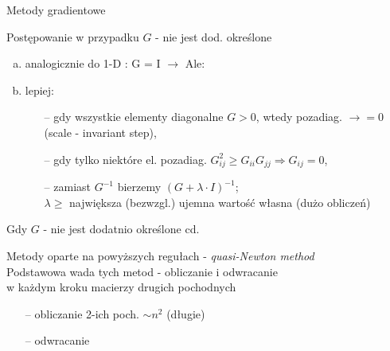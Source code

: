   \begin{frame}{Metody gradientowe}

 	\begin{block}{Postępowanie w przypadku $G$ - nie jest dod. określone}
 	   \begin{enumerate}[a)]
 	   		\item analogicznie do 1-D : G = I $\rightarrow$ Ale:
 	   		\item lepiej:
 	   		\begin{itemize}
 	   			\item[--] gdy wszystkie elementy diagonalne $G > 0$, wtedy pozadiag. $\rightarrow = 0$ (scale - invariant step),
 	   			\item[--] gdy tylko niektóre el. pozadiag. $G_{ij}^2 \geq G_{ii}G_{jj} \Rightarrow G_{ij} = 0$,
 	   			\item[--] zamiast $G^{-1}$ bierzemy $(G + \lambda \cdot I)^{-1}$;
 	   			\\ $\lambda \geq$ największa (bezwzgl.) ujemna wartość własna (dużo obliczeń)
 	   		\end{itemize}
 	   \end{enumerate}
 	\end{block}

  \end{frame}

  \begin{frame}{Gdy $G$ - nie jest dodatnio określone cd.}

 	\begin{block}{}
 	Metody oparte na powyższych regułach - \emph{quasi-Newton method}
 	\medskip
 	\\Podstawowa wada tych metod - obliczanie i odwracanie
 	\\w każdym kroku macierzy drugich pochodnych
 	\smallskip
 	   	\begin{itemize}
 	   		\item[--] obliczanie 2-ich poch. $\sim n^2$ (długie)
 	   		\item[--] odwracanie
 	   	\end{itemize}
 	\end{block}

  \end{frame}

